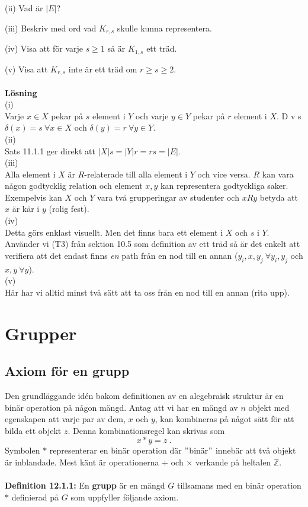 \documentclass{article}
\begin{document}
(ii) Vad är $|E|$?

(iii) Beskriv med ord vad $K_{r,s}$ skulle kunna representera.

(iv) Visa att för varje $s\geq 1$ så är $K_{1,s}$ ett träd.

(v) Visa att $K_{r,s}$ inte är ett träd om $r\geq s\geq2$.\\ \\ 
\textbf{Lösning}\\
(i)\\ 
Varje $x\in X$ pekar på $s$ element i $Y$ och varje $y\in Y$ pekar på $r$ element i $X$. D v s $\delta(x)=s \ \forall x\in X$ och $\delta(y)=r \ \forall y\in Y$.\\
(ii)\\
Sats 11.1.1 ger direkt att $|X|s=|Y|r=rs=|E|.$\\ 
(iii)\\ 
Alla element i $X$ är $R$-relaterade till alla element i $Y$ och vice versa. $R$ kan vara någon godtycklig relation och element $x,y$ kan representera godtyckliga saker. Exempelvis kan $X$ och $Y$ vara två grupperingar av studenter och $xRy$ betyda att $x$ är kär i $y$ (rolig fest).\\ 
(iv)\\ 
Detta görs enklast visuellt. Men det finns bara ett element i $X$ och $s$ i $Y$. Använder vi (T3) från sektion 10.5 som definition av ett träd så är det enkelt att verifiera att det endast finns \textit{en} path från en nod till en annan ($y_i,x,y_j \ \forall y_i,y_j$ och $x,y \ \forall y$).\\ 
(v)\\ 
Här har vi alltid minst två sätt att ta oss från en nod till en annan (rita upp).

\section{Grupper}
\subsection{Axiom för en grupp}
Den grundläggande idén bakom definitionen av en alegebraisk struktur är en binär operation på någon mängd. Antag att vi har en mängd av $n$ objekt med egenskapen att varje par av dem, $x$ och $y$, kan kombineras på något sätt för att bilda ett objekt $z$. Denna kombinationsregel kan skrivas som
$$
x*y=z \ .
$$
Symbolen $*$ representerar en binär operation där $"$binär$"$ innebär att två objekt är inblandade. Mest känt är operationerna $+$ och $\times$ verkande på heltalen $\mathbb{Z}$.\\ \\ 
\textbf{Definition 12.1.1:} En \textbf{grupp} är en mängd $G$ tillsamans med en binär operation $*$ definierad på $G$ som uppfyller följande axiom.\\ 
\end{document}
